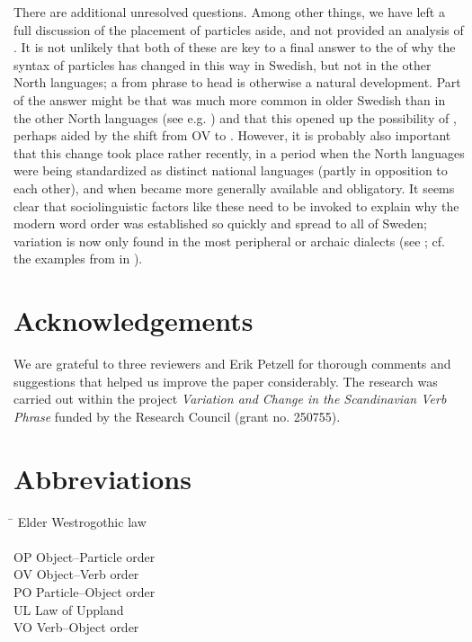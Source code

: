 \documentclass[output=paper]{langscibook}
\begin{document}
There are additional unresolved questions. Among other things, we have left a full discussion of the  placement of particles aside, and not provided an analysis of  . It is not unlikely that both of these are key to a final answer to the  of why the syntax of particles has changed in this way in Swedish, but not in the other North  languages; a  from phrase to head is otherwise a natural development. Part of the answer might be that   was much more common in older Swedish than in the other North  languages (see e.g. \citealt{Ljunggren1932}) and that this opened up the possibility of , perhaps aided by the shift from OV to . However, it is probably also important that this change took place rather recently, in a period when the North  languages were being standardized as distinct national languages (partly in opposition to each other), and when  became more generally available and obligatory. It seems clear that sociolinguistic factors like these need to be invoked to explain why the modern word order was established so quickly and spread to all of Sweden; variation is now only found in the most peripheral or archaic dialects (see \citealt{Lundquist2014Active}; cf. the examples from  in ).


\section*{Acknowledgements}

We are grateful to three reviewers and Erik Petzell for thorough comments and suggestions that helped us improve the paper considerably. The research was carried out within the project \textit{Variation and Change in the Scandinavian Verb Phrase} funded by the  Research Council (grant no. 250755).


\section*{Abbreviations}
\begin{multicols}{2}
\begin{tabbing}
 \hspace{1ex}\=  \kill
{} \>  Elder Westrogothic law\\
 \>  \\
OP  \> Object--Particle order\\
OV  \> Object–Verb order\\
PO  \> Particle–Object order\\
UL  \> Law of Uppland\\
VO  \> Verb–Object order\\
\end{tabbing}
\end{multicols}
\end{document}
